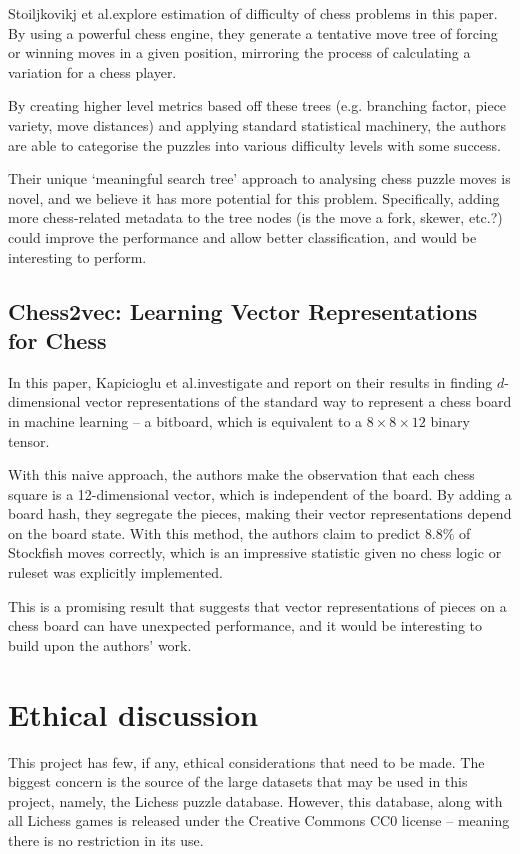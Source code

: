 Stoiljkovikj et al.\@ explore estimation of difficulty of chess problems in
this paper.\cite{chessTrees} By using a powerful chess engine, they generate a
tentative move tree of forcing or winning moves in a given position, mirroring
the process of calculating a variation for a chess player. 

By creating higher level metrics based off these trees (e.g. branching factor,
piece variety, move distances) and applying standard statistical machinery, the
authors are able to categorise the puzzles into various difficulty levels with
some success.

Their unique `meaningful search tree'\cite{chessTrees} approach to analysing
chess puzzle moves is novel, and we believe it has more potential for this
problem. Specifically, adding more chess-related metadata to the tree nodes (is
the move a fork, skewer, etc.?\@) could improve the performance and allow
better classification, and would be interesting to perform.

\subsection{Chess2vec: Learning Vector Representations for Chess}

In this paper, Kapicioglu et al.\@ investigate and report on their results in
finding $d$-dimensional vector representations of the standard way to represent
a chess board in machine learning -- a bitboard,\cite{chess2vec} which is
equivalent to a $8\times8\times12$ binary tensor. 

With this naive approach, the authors make the observation that each chess
square is a 12-dimensional vector, which is independent of the board. By adding
a board hash, they segregate the pieces, making their vector representations
depend on the board state. With this method, the authors claim to predict
$8.8\%$ of Stockfish moves correctly,\cite{chess2vec} which is an impressive
statistic given no chess logic or ruleset was explicitly implemented.

This is a promising result that suggests that vector representations of pieces
on a chess board can have unexpected performance, and it would be interesting
to build upon the authors' work.

\section{Ethical discussion}

This project has few, if any, ethical considerations that need to be made. The
biggest concern is the source of the large datasets that may be used in this
project, namely, the Lichess puzzle database.\cite{lichessPuzzles} However,
this database, along with all Lichess games is released under the Creative
Commons CC0 license -- meaning there is no restriction in its use.

